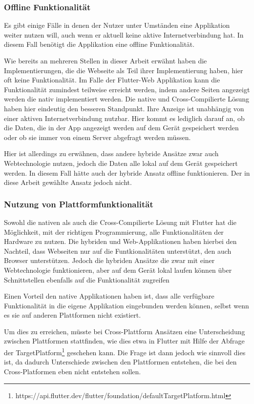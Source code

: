 \subsubsection{Offline Funktionalität}
Es gibt einige Fälle in denen der Nutzer unter Umständen eine Applikation weiter nutzen will, auch wenn er aktuell keine aktive Internetverbindung hat. In diesem Fall benötigt die Applikation eine offline Funktionalität.

Wie bereits an mehreren Stellen in dieser Arbeit erwähnt haben die Implementierungen, die die Webseite als Teil ihrer Implementierung haben, hier oft keine Funktionalität. Im Falle der Flutter-Web Applikation kann die Funktionalität zumindest teilweise erreicht werden, indem andere Seiten angezeigt werden die nativ implementiert werden. Die native und Cross-Compilierte Lösung haben hier eindeutig den besseren Standpunkt. Ihre Anzeige ist unabhängig von einer aktiven Internetverbindung nutzbar. Hier kommt es lediglich darauf an, ob die Daten, die in der App angezeigt werden auf dem Gerät gespeichert werden oder ob sie immer von einem Server abgefragt werden müssen. 

Hier ist allerdings zu erwähnen, dass andere hybride Ansätze zwar auch Webtechnologie nutzen, jedoch die Daten alle lokal auf dem Gerät gespeichert werden. In diesem Fall hätte auch der hybride Ansatz offline funktionieren. Der in diese Arbeit gewählte Ansatz jedoch nicht.

\subsubsection{Nutzung von Plattformfunktionalität}
Sowohl die nativen als auch die Cross-Compilierte Lösung mit Flutter hat die Möglichkeit, mit der richtigen Programmierung, alle Funktionalitäten der Hardware zu nutzen.
Die hybriden und Web-Applikationen haben hierbei den Nachteil, dass Webseiten nur auf die Funtkionalitäten unterstützt, den auch Browser unterstützen. Jedoch die hybriden Ansätze die zwar mit einer Webtechnologie funktionieren, aber auf dem Gerät lokal laufen können über Schnittstellen ebenfalls auf die Funktionalität zugreifen

Einen Vorteil den native Applikationen haben ist, dass alle verfügbare Funktionalität in die eigene Applikation eingebunden werden können, selbst wenn es sie auf anderen Plattformen nicht existiert.

Um dies zu erreichen, müsste bei Cross-Plattform Ansätzen eine Unterscheidung zwischen Plattformen stattfinden, wie dies etwa in Flutter mit Hilfe der Abfrage der TargetPlatform\footnote{https://api.flutter.dev/flutter/foundation/defaultTargetPlatform.html} geschehen kann. Die Frage ist dann jedoch wie sinnvoll dies ist, da dadurch Unterschiede zwischen den Plattformen entstehen, die bei den Cross-Platformen eben nicht entstehen sollen.

